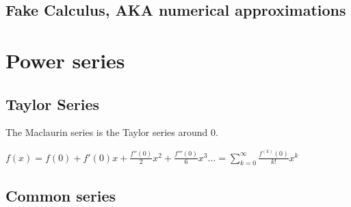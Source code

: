 \documentclass[a4paper,11pt]{article}
\begin{document}

    \subsection{Fake Calculus, AKA numerical approximations}

    \section{Power series} %

    \subsection{Taylor Series}

    The Maclaurin series is the Taylor series around $0$.

    $\displaystyle
     f(x) = f(0) + f'(0) x + \frac{f''(0)} 2 x^2 + \frac{f'''(0)}{6}x^3 \ldots
     = \sum_{k=0}^\infty \frac{f^{(k)}(0)}{k!}x^k$

    \subsection{Common series}
\end{document}
